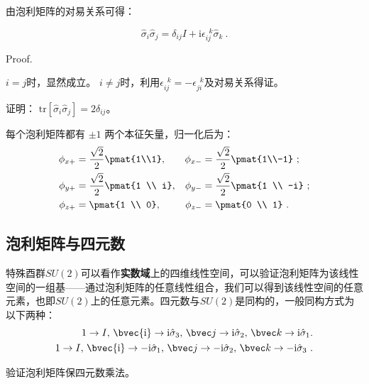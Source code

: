 由泡利矩阵的对易关系可得：
\begin{theorem}{}
\begin{equation}\label{eq_pauliM_1}
\hat{\sigma}_i\hat{\sigma}_j = \delta_{ij}I + \mathrm {i}\epsilon ^{\,\,\, k}_{ij}\hat{\sigma}_k~.
\end{equation}
\end{theorem}
Proof.

$i=j$时，显然成立。
$i\neq j$时，利用$\epsilon ^{\,\,\, k}_{ij}=-\epsilon ^{\,\,\, k}_{ji}$及对易关系得证。


\begin{exercise}{}
证明：
$\mathrm{tr}[\hat{\sigma}_i \hat{\sigma}_j]= 2\delta_{ij}$。
\end{exercise}

每个泡利矩阵都有 $\pm 1$ 两个本征矢量，归一化后为：
\begin{equation}
\begin{aligned}
\phi_{x+} &= \frac{\sqrt 2}{2}\pmat{1\\1}, &\phi_{x-} &= \frac{\sqrt 2}{2} \pmat{1\\-1}~;\\
\phi_{y+} &= \frac{\sqrt 2}{2}\pmat{1 \\ i}, &\phi_{y-} &= \frac{\sqrt 2}{2} \pmat{1 \\ -i} ~;\\
\phi_{z+} &= \pmat{1 \\ 0}, &\phi_{z-} &= \pmat{0 \\ 1}~.
\end{aligned}
\end{equation}

\subsection{泡利矩阵与四元数}
特殊酉群$SU(2)$可以看作\textbf{实数域}上的四维线性空间，可以验证泡利矩阵为该线性空间的一组基——通过泡利矩阵的任意线性组合，我们可以得到该线性空间的任意元素，也即$SU(2)$上的任意元素。四元数与$SU(2)$是同构的，一般同构方式为以下两种：
\begin{equation}
\begin{aligned}
1\rightarrow I,\,\bvec{\mathrm i}\rightarrow \mathrm i \hat{\sigma}_3,\,\bvec j\rightarrow \mathrm i\hat{\sigma}_2,\,\bvec k\rightarrow \mathrm i\hat{\sigma}_1.\\
1\rightarrow I,\,\bvec{\mathrm i}\rightarrow -\mathrm i\hat{\sigma}_1,\,\bvec j\rightarrow -\mathrm i\hat{\sigma}_2,\,\bvec k\rightarrow -\mathrm i\hat{\sigma}_3~.
\end{aligned}
\end{equation}

\begin{exercise}{}
验证泡利矩阵保四元数乘法。
\end{exercise}